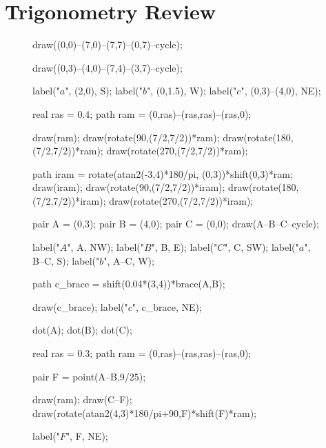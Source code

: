 \documentclass[../gatm_answers.tex]{subfiles}
\begin{document}
\allowdisplaybreaks

\section{Trigonometry Review}

\begin{figure}[h]
	\begin{center}
		\begin{minipage}[b]{0.45\textwidth}
			\centering
			\begin{asy}[width=0.5\textwidth]
			draw((0,0)--(7,0)--(7,7)--(0,7)--cycle);
			
			draw((0,3)--(4,0)--(7,4)--(3,7)--cycle);
			
			label("$a$", (2,0), S);
			label("$b$", (0,1.5), W);
			label("$c$", (0,3)--(4,0), NE);
			
			real ras = 0.4;
			path ram = (0,ras)--(ras,ras)--(ras,0);
			
			draw(ram);
			draw(rotate(90,(7/2,7/2))*ram);
			draw(rotate(180,(7/2,7/2))*ram);
			draw(rotate(270,(7/2,7/2))*ram);
			
			path iram = rotate(atan2(-3,4)*180/pi, (0,3))*shift(0,3)*ram;
			draw(iram);
			draw(rotate(90,(7/2,7/2))*iram);
			draw(rotate(180,(7/2,7/2))*iram);
			draw(rotate(270,(7/2,7/2))*iram);
			\end{asy}
		\end{minipage}
		\hfill
		\begin{minipage}[b]{0.45\textwidth}
			\centering
			\begin{asy}[width=0.7\textwidth]
			pair A = (0,3);
			pair B = (4,0);
			pair C = (0,0);
			draw(A--B--C--cycle);
			
			label("$A$", A, NW);
			label("$B$", B, E);
			label("$C$", C, SW);
			label("$a$", B--C, S);
			label("$b$", A--C, W);
			
			path c_brace = shift(0.04*(3,4))*brace(A,B);
			
			draw(c_brace);
			label("$c$", c_brace, NE);
			
			dot(A);
			dot(B);
			dot(C);
			
			real ras = 0.3;
			path ram = (0,ras)--(ras,ras)--(ras,0);
			
			pair F = point(A--B,9/25);
			
			draw(ram);
			draw(C--F);
			draw(rotate(atan2(4,3)*180/pi+90,F)*shift(F)*ram);
			
			label("$F$", F, NE);
			

\end{asy}
\end{minipage}
\end{center}
\end{figure}
\end{document}
